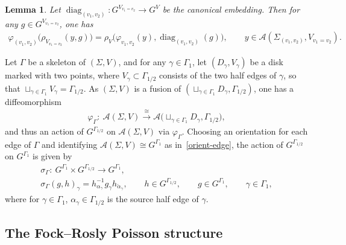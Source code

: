 \documentclass[10pt,a4paper]{amsart}
\numberwithin{equation}{section}
\newtheorem{Lemma}[Theorem]{Lemma}
\def \A {{\mathcal{A}}}
\DeclareMathOperator{\diag}{diag}
\def \sV {{\scriptscriptstyle V}}
\def \sGam {{\scriptscriptstyle \Gamma}}
\newcommand{\calpha}{\check{\alpha}}
\begin{document}
\begin{Lemma} \label{big-action}
Let $\diag_{(v_1, v_2)}\colon G^{V_{v_1=v_2}} \to G^V$ be the canonical embedding. Then for any $g \in G^{V_{v_1= v_2}}$, one has
\begin{gather*}
\varphi_{(v_1, v_2)}\big(\rho_{\sV_{v_1=v_2}}(y, g)\big) = \rho_{\sV} \big( \varphi_{v_1, v_2}(y), \diag_{(v_1, v_2)}(g) \big), \qquad y \in \A(\Sigma_{(v_1, v_2)}, V_{v_1= v_2}).
\end{gather*}
\end{Lemma}


Let $\Gamma$ be a skeleton of $(\Sigma, V)$, and for any $\gamma \in \Gamma_1$, let $(D_\gamma, V_\gamma)$ be a disk marked with two points, where $V_\gamma \subset \Gamma_{1/2}$ consists of the two half edges of $\gamma$, so that $\sqcup_{\gamma \in \Gamma_1} V_\gamma= \Gamma_{1/2}$. As $(\Sigma, V)$ is a fusion of $(\sqcup_{\gamma \in \Gamma_1} D_\gamma, \Gamma_{1/2})$, one has a dif\/feomorphism
\begin{gather*}
\varphi_{\sGam}\colon \ \A(\Sigma, V) \stackrel{\cong}{\longrightarrow} \A\big(\sqcup_{\gamma \in \Gamma_1} D_\gamma, \Gamma_{1/2}\big),
\end{gather*}
and thus an action of $G^{\Gamma_{1/2}}$ on $\A(\Sigma, V)$ via $\varphi_{\sGam}$. Choosing an orientation for each edge of $\Gamma$ and identifying $\A(\Sigma, V) \cong G^{\Gamma_1}$ as in~\eqref{orient-edge}, the action of $G^{\Gamma_{1/2}}$ on $G^{\Gamma_1}$ is given by
\begin{gather}
\sigma_{\sGam}\colon \ G^{\Gamma_1} \times G^{\Gamma_{1/2}} \to G^{\Gamma_1}, \nonumber\\
\sigma_{\sGam}(g, h)_\gamma = h_{\alpha_\gamma}^{-1} g_\gamma h_{\calpha_\gamma}, \qquad h \in G^{\Gamma_{1/2}}, \qquad g \in G^{\Gamma_1}, \qquad \gamma \in \Gamma_1, \label{sigma}
\end{gather}
where for $\gamma \in \Gamma_1$, $\alpha_\gamma \in \Gamma_{1/2}$ is the source half edge of $\gamma$.

\subsection{The Fock--Rosly Poisson structure} \label{subsec-FR}
\end{document}
